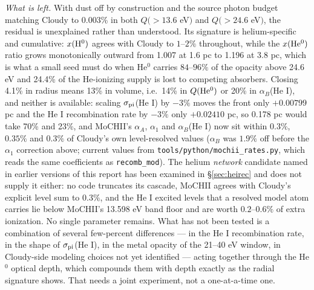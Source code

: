 \documentclass[11pt]{my_memo}
\begin{document}
\emph{What is left.}  With dust off by construction and the source photon budget matching Cloudy to 0.003\% in both $Q(>13.6$ eV$)$ and $Q(>24.6$ eV$)$, the residual is unexplained rather than understood.  Its signature is helium-specific and cumulative: $x({\rm H^0})$ agrees with Cloudy to $1$--$2\%$ throughout, while the $x({\rm He^0})$ ratio grows monotonically outward from 1.007 at 1.6 pc to 1.196 at 3.8 pc, which is what a small seed must do when He$^0$ carries $84$--$96\%$ of the opacity above 24.6 eV and 24.4\% of the He-ionizing supply is lost to competing absorbers.  Closing 4.1\% in radius means 13\% in volume, i.e.\ 14\% in $Q({\rm He^0})$ or 20\% in $\alpha_B$(He I), and neither is available: scaling $\sigma_{\rm pi}$(He I) by $-3\%$ moves the front only $+0.00799$ pc and the He I recombination rate by $-3\%$ only $+0.02410$ pc, so 0.178 pc would take 70\% and 23\%, and MoCHII's $\alpha_A$, $\alpha_1$ and $\alpha_B$(He I) now sit within $0.3\%$, $0.35\%$ and $0.3\%$ of Cloudy's own level-resolved values ($\alpha_B$ was $1.9\%$ off before the $\alpha_1$ correction above; current values from \texttt{tools/python/mochii\_rates.py}, which reads the same coefficients as \texttt{recomb\_mod}).  The helium \emph{network} candidate named in earlier versions of this report has been examined in \S\ref{sec:heirec} and does not supply it either: no code truncates its cascade, MoCHII agrees with Cloudy's explicit level sum to $0.3\%$, and the He I excited levels that a resolved model atom carries lie below MoCHII's 13.598 eV band floor and are worth $0.2$--$0.6\%$ of extra ionization.  No single parameter remains.  What has not been tested is a combination of several few-percent differences --- in the He I recombination rate, in the shape of $\sigma_{\rm pi}$(He I), in the metal opacity of the 21--40 eV window, in Cloudy-side modeling choices not yet identified --- acting together through the He$^0$ optical depth, which compounds them with depth exactly as the radial signature shows.  That needs a joint experiment, not a one-at-a-time one.
\end{document}
